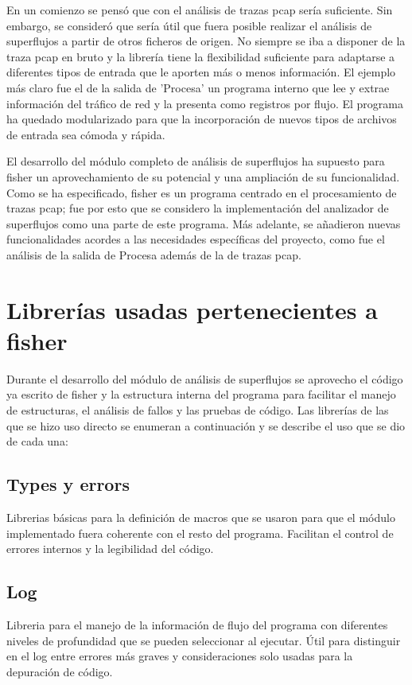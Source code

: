 \documentclass[twoside, 12pt]{epstfg}
\begin{document}
En un comienzo se pensó que con el análisis de trazas pcap sería suficiente. Sin embargo, se consideró que sería útil que fuera posible realizar el análisis de superflujos a partir de otros ficheros de origen. No siempre se iba a disponer de la traza pcap en bruto y la librería tiene la flexibilidad suficiente para adaptarse a diferentes tipos de entrada que le aporten más o menos información. El ejemplo más claro fue el de la salida de 'Procesa' un programa interno que lee y extrae información del tráfico de red y la presenta como registros por flujo. El programa ha quedado modularizado para que la incorporación de nuevos tipos de archivos de entrada sea cómoda y rápida.

El desarrollo del módulo completo de análisis de superflujos ha supuesto para fisher un aprovechamiento de su potencial y una ampliación de su funcionalidad. Como se ha especificado, fisher es un programa centrado en el procesamiento de trazas pcap; fue por esto que se considero la implementación del analizador de superflujos como una parte de este programa. Más adelante, se añadieron nuevas funcionalidades acordes a las necesidades específicas del proyecto, como fue el análisis de la salida de Procesa además de la de trazas pcap.


\section{Librerías usadas pertenecientes a fisher}
Durante el desarrollo del módulo de análisis de superflujos se aprovecho el código ya escrito de fisher y la estructura interna del programa para facilitar el manejo de estructuras, el análisis de fallos y las pruebas de código. Las librerías de las que se hizo uso directo se enumeran a continuación y se describe el uso que se dio de cada una:
\subsection{Types y errors}
Librerias básicas para la definición de macros que se usaron para que el módulo implementado fuera coherente con el resto del programa. Facilitan el control de errores internos y la legibilidad del código.
\subsection{Log} 
Libreria para el manejo de la información de flujo del programa con diferentes niveles de profundidad que se pueden seleccionar al ejecutar. Útil para distinguir en el log entre errores más graves y consideraciones solo usadas para la depuración de código.
\end{document}
